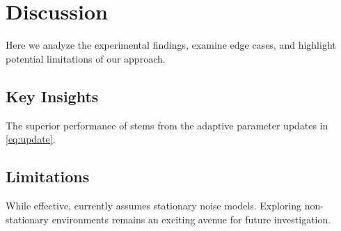 \section{Discussion}
\label{sec:discussion}

Here we analyze the experimental findings, examine edge cases, and highlight potential limitations of our approach.

\subsection{Key Insights}
The superior performance of \sister{} stems from the adaptive parameter updates in \cref{eq:update}.

\subsection{Limitations}
While effective, \sister{} currently assumes stationary noise models. Exploring non-stationary environments remains an exciting avenue for future investigation.
